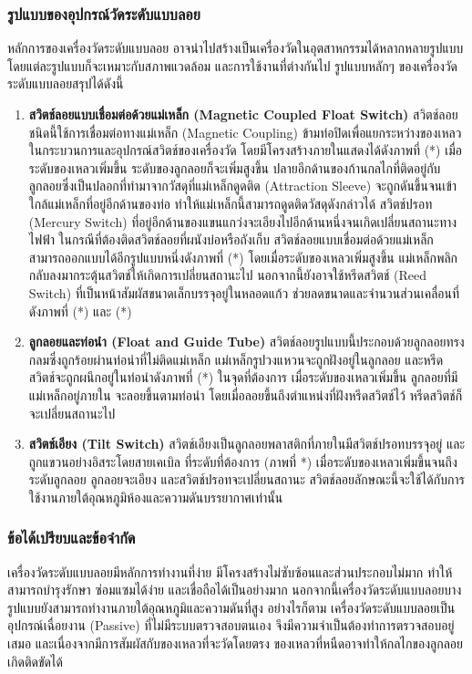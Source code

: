 \documentclass[final,11pt]{article}
\begin{document}
\subsubsection{รูปแบบของอุปกรณ์วัดระดับแบบลอย}
หลักการของเครื่องวัดระดับแบบลอย อาจนำไปสร้างเป็นเครื่องวัดในอุตสาหกรรมได้หลากหลายรูปแบบ โดยแต่ละรูปแบบก็จะเหมาะกับสภาพแวดล้อม 
และการใช้งานที่ต่างกันไป รูปแบบหลักๆ ของเครื่องวัดระดับแบบลอยสรุปได้ดังนี้
\begin{enumerate}
    \item \textbf{สวิตช์ลอยแบบเชื่อมต่อด้วยแม่เหล็ก (Magnetic Coupled Float Switch)} สวิตช์ลอยชนิดนี้ใช้การเชื่อมต่อทางแม่เหล็ก (Magnetic Coupling)
    ข้ามท่อปิดเพื่อแยกระหว่างของเหลวในกระบวนการและอุปกรณ์สวิตช์ของเครื่องวัด โดยมีโครงสร้างภายในแสดงได้ดังภาพที่ (*)
    เมื่อระดับของเหลวเพิ่มขึ้น ระดับของลูกลอยก็จะเพิ่มสูงขึ้น ปลายอีกด้านของก้านกลไกที่ติดอยู่กับลูกลอยซึ่งเป็นปลอกที่ทำมาจากวัสดุที่แม่เหล็กดูดติด (Attraction Sleeve) 
    จะถูกดันขึ้นจนเข้าใกล้แม่เหล็กที่อยู่อีกด้านของท่อ ทำให้แม่เหล็กนี้สามารถดูดติดวัสดุดังกล่าวได้ สวิตช์ปรอท (Mercury Switch) ที่อยู่อีกด้านของแขนแกว่งจะเอียงไปอีกด้านหนึ่งจนเกิดเปลี่ยนสถานะทางไฟฟ้า
    ในกรณีที่ต้องติดสวิตช์ลอยที่ผนังบ่อหรือถังเก็บ สวิตช์ลอยแบบเชื่อมต่อด้วยแม่เหล็กสามารถออกแบบได้อีกรูปแบบหนึ่งดังภาพที่ (*) โดยเมื่อระดับของเหลวเพิ่มสูงขึ้น
    แม่เหล็กพลิกกลับลงมากระตุ้นสวิตช์ให้เกิดการเปลี่ยนสถานะไป นอกจากนี้ยังอาจใช้หรีดสวิตช์ (Reed Switch) ที่เป็นหน้าสัมผัสขนาดเล็กบรรจุอยู่ในหลอดแก้ว 
    ช่วยลดขนาดและจำนวนส่วนเคลื่อนที่ ดังภาพที่ (*) และ (*) 
    \item \textbf{ลูกลอยและท่อนำ (Float and Guide Tube)} สวิตช์ลอยรูปแบบนี้ประกอบด้วยลูกลอยทรงกลมซึ่งถูกร้อยผ่านท่อนำที่ไม่ติดแม่เหล็ก
    แม่เหล็กรูปวงแหวนจะถูกฝังอยู่ในลูกลอย และหรีดสวิตช์จะถูกผนึกอยู่ในท่อนำดังภาพที่ (*) ในจุดที่ต้องการ เมื่อระดับของเหลวเพิ่มขึ้น ลูกลอยที่มีแม่เหล็กอยู่ภายใน
    จะลอยขึ้นตามท่อนำ โดยเมื่อลอยขึ้นถึงตำแหน่งที่ฝังหรีดสวิตช์ไว้ หรีดสวิตช์ก็จะเปลี่ยนสถานะไป
    \item \textbf{สวิตช์เอียง (Tilt Switch)} สวิตช์เอียงเป็นลูกลอยพลาสติกที่ภายในมีสวิตช์ปรอทบรรจุอยู่ และถูกแขวนอย่างอิสระโดยสายเคเบิล 
    ที่ระดับที่ต้องการ (ภาพที่ *) เมื่อระดับของเหลวเพิ่มขึ้นจนถึงระดับลูกลอย ลูกลอยจะเอียง และสวิตช์ปรอทจะเปลี่ยนสถานะ 
    สวิตช์ลอยลักษณะนี้จะใช้ได้กับการใช้งานภายใต้อุณหภูมิห้องและความดันบรรยากาศเท่านั้น
\end{enumerate}

\subsubsection{ข้อได้เปรียบและข้อจำกัด}
เครื่องวัดระดับแบบลอยมีหลักการทำงานที่ง่าย มีโครงสร้างไม่ซับซ้อนและส่วนประกอบไม่มาก ทำให้สามารถบำรุงรักษา ซ่อมแซมได้ง่าย และเชื่อถือได้เป็นอย่างมาก
นอกจากนี้เครื่องวัดระดับแบบลอยบางรูปแบบยังสามารถทำงานภายใต้อุณหภูมิและความดันที่สูง อย่างไรก็ตาม เครื่องวัดระดับแบบลอยเป็นอุปกรณ์เฉื่อยงาน (Passive) 
ที่ไม่มีระบบตรวจสอบตนเอง จึงมีความจำเป็นต้องทำการตรวจสอบอยู่เสมอ และเนื่องจากมีการสัมผัสกับของเหลวที่จะวัดโดยตรง ของเหลวที่หนืดอาจทำให้กลไกของลูกลอยเกิดติดขัดได้
\end{document}
